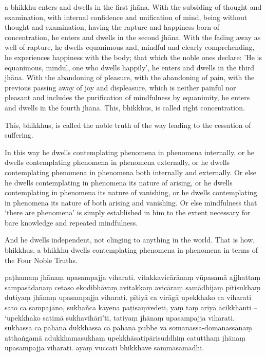 \englishPage

a bhikkhu enters and dwells in the first jhāna. With the subsiding of thought
and examination, with internal confidence and unification of mind, being without
thought and examination, having the rapture and happiness born of concentration,
he enters and dwells in the second jhāna. With the fading away as well of
rapture, he dwells equanimous and, mindful and clearly comprehending, he
experiences happiness with the body; that which the noble ones declare: 'He is
equanimous, mindul, one who dwells happily', he enters and dwells in the third
jhāna. With the abandoning of pleasure, with the abandoning of pain, with the
previous passing away of joy and displeasure, which is neither painful nor
pleasant and includes the purification of mindfulness by equanimity, he enters
and dwells in the fourth jhāna. This, bhikkhus, is called right concentration.

This, bhikkhus, is called the noble truth of the way leading to the cessation of
suffering.

In this way he dwells contemplating phenomena in phenomena internally, or he
dwells contemplating phenomena in phenomena externally, or he dwells
contemplating phenomena in phenomena both internally and externally. Or else he
dwells contemplating in phenomena its nature of arising, or he dwells
contemplating in phenomena its nature of vanishing, or he dwells contemplating
in phenomena its nature of both arising and vanishing. Or else mindfulness that
‘there are phenomena’ is simply established in him to the extent necessary for
bare knowledge and repeated mindfulness.

And he dwells independent, not clinging to anything in the world. That is how,
bhikkhus, a bhikkhu dwells contemplating phenomena in phenomena in terms of the
Four Noble Truths.



\paliPage

paṭhamaṃ jhānaṃ upasampajja viharati. vitakkavicārānaṃ vūpasamā ajjhattaṃ
sampasādanaṃ cetaso ekodibhāvaṃ avitakkaṃ avicāraṃ samādhijaṃ pītisukhaṃ dutiyaṃ
jhānaṃ upasampajja viharati. pītiyā ca virāgā upekkhako ca viharati sato ca
sampajāno, sukhañca kāyena paṭisaṃvedeti, yaṃ taṃ ariyā ācikkhanti -- ‘upekkhako
satimā sukhavihārī’ti, tatiyaṃ jhānaṃ upasampajja viharati. sukhassa ca pahānā
dukkhassa ca pahānā pubbe va somanassa-domanassānaṃ atthaṅgamā adukkhamasukhaṃ
upekkhāsatipārisuddhiṃ catutthaṃ jhānaṃ upasampajja viharati. ayaṃ vuccati
bhikkhave sammāsamādhi.


